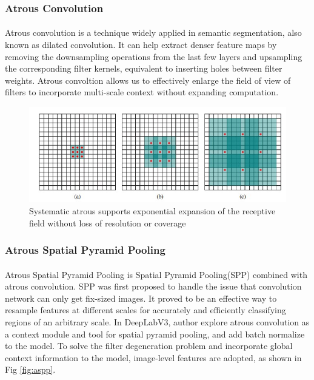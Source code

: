 \subsubsection{Atrous Convolution}
\paragraph{}
Atrous convolution is a technique widely applied in semantic segmentation, also known as dilated convolution. It can help extract denser feature maps by removing the downsampling operations from the last few layers and upsampling the corresponding filter kernels, equivalent to inserting holes between filter weights. Atrous convoltion allows us to effectively enlarge the field of view of filters to incorporate multi-scale context\cite{dilatedcon} without expanding computation.

\begin{figure}
    \centering
    \includegraphics{Section3/dilated convolution.jpg}
    \caption{Systematic atrous supports exponential expansion of the receptive field without loss of resolution or coverage}
    \label{fig:dilated}
\end{figure}

\subsubsection{Atrous Spatial Pyramid Pooling}
\paragraph{}
Atrous Spatial Pyramid Pooling is Spatial Pyramid Pooling(SPP) combined with atrous convolution. SPP was first proposed to handle the issue that convolution network can only get fix-sized images\cite{spp}. It proved to be an effective way to resample features at different scales for accurately and efficiently classifying regions of an arbitrary scale. In DeepLabV3, author explore atrous convolution as a context module and tool for spatial pyramid pooling, and add batch normalize to the model. To solve the filter degeneration problem and incorporate global context information to the model, image-level features are adopted, as shown in Fig \ref{fig:aspp}.

